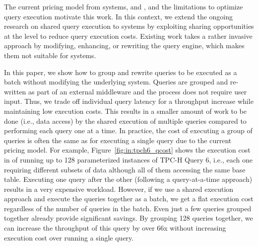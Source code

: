 The current pricing model from \qaasl systems, \athena and \bigquery, and the
limitations to optimize query execution motivate this work. In this context, we
extend the ongoing research on shared query execution to \qaasl systems by
exploiting sharing opportunities at the \sql level to reduce query
execution costs.  Existing work takes a rather invasive approach by modifying,
enhancing, or rewriting the query engine, which makes them not suitable for
\qaasl systems.

In this paper, we show how to group and rewrite
\sql queries to be executed as a batch without modifying the underlying
system.
Queries are grouped and re-written as
part of an external middleware and the process does not require user input.
Thus, we trade off individual query latency for a throughput increase
while maintaining low execution costs.  This results in a smaller amount of work
to be done (i.e., data access) by the shared execution of multiple queries
compared to performing each query one at a time. In practice, the cost of executing a group
of queries is often the same as for executing a single query due to the current
\qaasl pricing model.  For example, Figure~\ref{fig:in:tpch6_qcost} shows the
execution cost in \athena of running up to 128 parameterized instances of TPC-H
    Query 6, i.e., each one requiring different subsets of data although all of
    them accessing the same base table.
Executing one
query after the other (following a query-at-a-time approach)
results in a very expensive workload. 
However, if we use a shared execution
approach and execute the queries together as a batch, we get a flat execution cost
regardless of the number of queries in the batch.  Even just a few queries
grouped together already provide significant savings. By grouping
128 queries together, we can increase
the throughput of this query by over 66x without increasing execution
cost over running a single query.


%    


